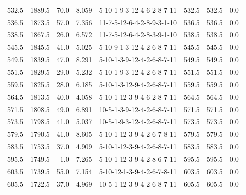 \begin{tabular}{rrrrlrrr}
 532.5 &  1889.5 &           70.0 &              8.059 &  5-10-1-9-3-12-4-6-2-8-7-11 &         532.5 &           532.5 &       0.0 \\
 536.5 &  1873.5 &           57.0 &              7.356 &  11-7-5-12-6-4-2-8-9-3-1-10 &         536.5 &           536.5 &       0.0 \\
 538.5 &  1867.5 &           26.0 &              6.572 &  11-7-5-12-6-4-2-8-3-9-1-10 &         538.5 &           538.5 &       0.0 \\
 545.5 &  1845.5 &           41.0 &              5.025 &  5-10-9-1-3-12-4-2-6-8-7-11 &         545.5 &           545.5 &       0.0 \\
 549.5 &  1839.5 &           47.0 &              8.291 &  5-10-1-3-9-12-4-2-6-8-7-11 &         549.5 &           549.5 &       0.0 \\
 551.5 &  1829.5 &           29.0 &              5.232 &  5-10-1-9-3-12-4-2-6-8-7-11 &         551.5 &           551.5 &       0.0 \\
 559.5 &  1825.5 &           28.0 &              6.185 &  5-10-1-3-12-9-4-2-6-8-7-11 &         559.5 &           559.5 &       0.0 \\
 564.5 &  1813.5 &           40.0 &              4.058 &  5-10-1-12-3-9-4-6-2-8-7-11 &         564.5 &           564.5 &       0.0 \\
 571.5 &  1808.5 &           49.0 &              6.891 &  10-5-1-3-9-12-4-2-6-8-7-11 &         571.5 &           571.5 &       0.0 \\
 573.5 &  1798.5 &           41.0 &              5.037 &  10-5-1-9-3-12-4-2-6-8-7-11 &         573.5 &           573.5 &       0.0 \\
 579.5 &  1790.5 &           41.0 &              8.605 &  5-10-1-12-3-9-4-2-6-7-8-11 &         579.5 &           579.5 &       0.0 \\
 583.5 &  1753.5 &           37.0 &              4.909 &  5-10-1-12-3-9-4-2-6-8-7-11 &         583.5 &           583.5 &       0.0 \\
 595.5 &  1749.5 &            1.0 &              7.265 &  5-10-1-12-3-9-4-2-8-6-7-11 &         595.5 &           595.5 &       0.0 \\
 603.5 &  1739.5 &           55.0 &              7.154 &  5-10-12-1-3-9-4-2-6-7-8-11 &         603.5 &           603.5 &       0.0 \\
 605.5 &  1722.5 &           37.0 &              4.969 &  10-5-1-12-3-9-4-2-6-8-7-11 &         605.5 &           605.5 &       0.0 \\

\end{tabular}
